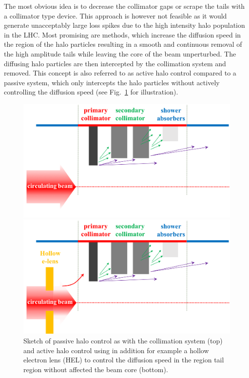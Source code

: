 \documentclass[%
 reprint,
 amsmath,amssymb,
 aps,
prstab,
]{revtex4-1}
\begin{document}
The most obvious idea is to decrease the collimator gaps or scrape the tails with a collimator type device. This approach is however not feasible as it would generate unacceptably large loss spikes due to the high intensity halo population in the LHC. Most promising are methods, which increase the diffusion speed in the region of the halo particles resulting in a smooth and continuous removal of the high amplitude tails while leaving the core of the beam unperturbed. The diffusing halo particles are then intercepted by the collimation system and removed. This concept is also referred to as active halo control compared to a passive system, which only intercepts the halo particles without actively controlling the diffusion speed (see Fig.~\ref{fig:active_halo_control} for illustration).
\begin{figure}[h]
	\begin{minipage}[t]{1.0\linewidth}
		\centering
		\includegraphics[width=0.7\linewidth]{passive_halo_control.png}
	\end{minipage}
	\begin{minipage}[t]{1.0\linewidth}
		\centering
		\includegraphics[width=0.7\linewidth]{active_halo_control.png}
	\end{minipage}	
	\caption{\label{fig:active_halo_control} Sketch of passive halo control as with the collimation system (top) and active halo control using in addition for example a hollow electron lens (HEL) to control the diffusion speed in the region tail region without affected the beam core (bottom).}
\end{figure}
\end{document}
